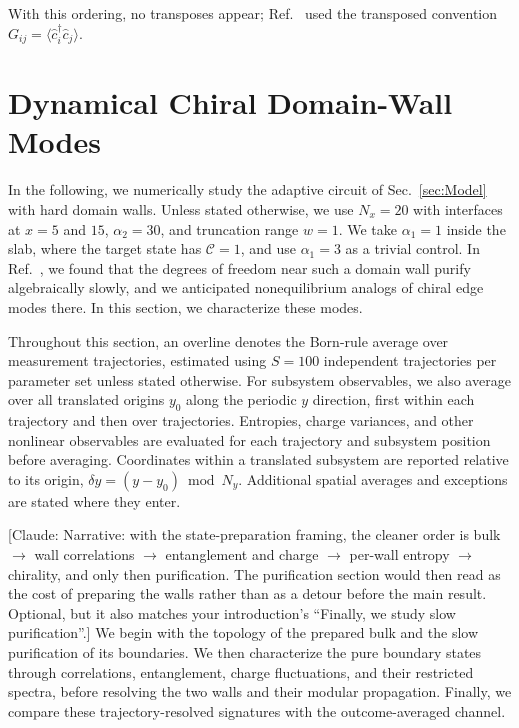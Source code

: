 \documentclass[aps,prb,10pt,twocolumn,superscriptaddress,longbibliography,floatfix]{revtex4-2}
\newcommand{\mc}[1]{\mathcal{#1}}
\newcommand{\claudeadd}[1]{{\color{orange}#1}}
\newcommand{\claudecom}[1]{{\color{ForestGreen}[Claude: #1]}}
\begin{document}
\claudeadd{With this ordering, no transposes appear; Ref.~\cite{BhuiyanPanJian2026} used the transposed convention $G_{ij}=\langle\hat c_i^\dagger\hat c_j\rangle$.}

\FloatBarrier
\section{Dynamical Chiral Domain-Wall Modes}
\label{sec:Results}

In the following, we numerically study the adaptive circuit of Sec.~\ref{sec:Model} with hard domain walls. Unless stated otherwise, we use $N_x=20$ with interfaces at $x=5$ and $15$, $\alpha_2=30$, and truncation range $w=1$. We take $\alpha_1=1$ inside the slab, where the target state has $\mc C=1$, and use $\alpha_1=3$ as a trivial control. In Ref.~\cite{BhuiyanPanJian2026}, we found that the degrees of freedom near such a domain wall purify algebraically slowly, and we anticipated nonequilibrium analogs of chiral edge modes there. In this section, we characterize these modes.
{\color{blue}
Throughout this section, an overline denotes the Born-rule average over measurement trajectories, estimated using $S=100$ independent trajectories per parameter set unless stated otherwise. For subsystem observables, we also average over all translated origins $y_0$ along the periodic $y$ direction, first within each trajectory and then over trajectories. Entropies, charge variances, and other nonlinear observables are evaluated for each trajectory and subsystem position before averaging. Coordinates within a translated subsystem are reported relative to its origin, $\delta y=(y-y_0)\bmod N_y$. Additional spatial averages and exceptions are stated where they enter.

\claudecom{Narrative: with the state-preparation framing, the cleaner order is bulk $\to$ wall correlations $\to$ entanglement and charge $\to$ per-wall entropy $\to$ chirality, and only then purification. The purification section would then read as the cost of preparing the walls rather than as a detour before the main result. Optional, but it also matches your introduction's ``Finally, we study slow purification''.} We begin with the topology of the prepared bulk and the slow purification of its boundaries. We then characterize the pure boundary states through correlations, entanglement, charge fluctuations, and their restricted spectra, before resolving the two walls and their modular propagation. Finally, we compare these trajectory-resolved signatures with the outcome-averaged channel.
}
\end{document}
